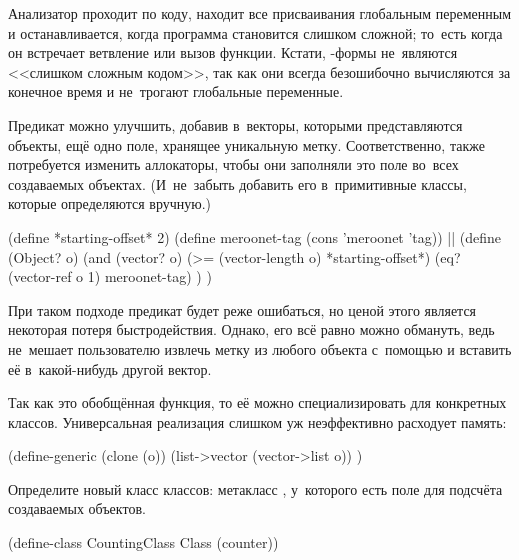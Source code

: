 Анализатор проходит по коду, находит все присваивания глобальным переменным и
останавливается, когда программа становится слишком сложной; то~есть когда он
встречает ветвление или вызов функции. Кстати, -формы не~являются
<<слишком сложным кодом>>, так как они всегда безошибочно вычисляются за
конечное время и не~трогают глобальные переменные.




Предикат  можно улучшить, добавив в~векторы, которыми представляются
объекты, ещё одно поле, хранящее уникальную метку. Соответственно, также
потребуется изменить аллокаторы, чтобы они заполняли это поле во~всех
создаваемых объектах. (И~не~забыть добавить его в~примитивные классы, которые
определяются вручную.)

\begin{code:lisp}
(define *starting-offset* 2)
(define meroonet-tag (cons 'meroonet 'tag))
||
(define (Object? o)
  (and (vector? o)
       (>= (vector-length o) *starting-offset*)
       (eq? (vector-ref o 1) meroonet-tag) ) )
\end{code:lisp}

При таком подходе предикат  будет реже ошибаться, но ценой этого
является некоторая потеря быстродействия. Однако, его всё равно можно обмануть,
ведь не~мешает пользователю извлечь метку из любого объекта с~помощью
 и вставить её в~какой-нибудь другой вектор.



Так как это обобщённая функция, то её можно специализировать для конкретных
классов. Универсальная реализация слишком уж неэффективно расходует память:

\begin{code:lisp}
(define-generic (clone (o))
  (list->vector (vector->list o)) )
\end{code:lisp}



Определите новый класс классов: метакласс , у~которого есть
поле для подсчёта создаваемых объектов.

\begin{code:lisp}
(define-class CountingClass Class (counter))
\end{code:lisp}

